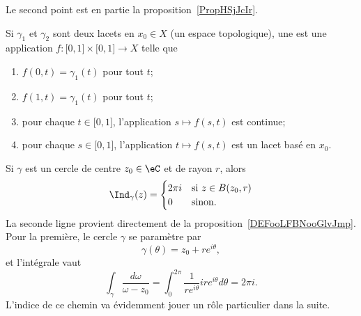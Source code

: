Le second point est en partie la proposition~\ref{PropHSjJcIr}.

\begin{definition}  \label{DefECnFJQp}
	Si \( \gamma_1\) et \( \gamma_2\) sont deux lacets en \( x_0\in X\) (un espace topologique), une  est une application \( f\colon \mathopen[ 0 , 1 \mathclose]\times \mathopen[ 0 , 1 \mathclose]\to X\) telle que
	\begin{enumerate}
		\item
		      \( f(0,t)=\gamma_1(t)\) pour tout \( t\);
		\item
		      \( f(1,t)=\gamma_1(t)\) pour tout \( t\);
		\item
		      pour chaque \( t\in \mathopen[ 0 , 1 \mathclose]\), l'application \( s\mapsto f(s,t)\) est continue;
		\item
		      pour chaque \( s\in \mathopen[ 0 , 1 \mathclose]\), l'application \( t\mapsto f(s,t)\) est un lacet basé en \( x_0\).
	\end{enumerate}
\end{definition}

\begin{example} \label{ExradygL}
	Si \( \gamma\) est un cercle de centre \( z_0\in \eC\) et de rayon \( r\), alors
	\begin{equation}
		\Ind_{\gamma}(z)=\begin{cases}
			2\pi i & \text{si } z\in B(z_0,r) \\
			0      & \text{sinon}.
		\end{cases}
	\end{equation}
	La seconde ligne provient directement de la proposition~\ref{DEFooLFBNooGlvJmp}. Pour la première, le cercle \( \gamma\) se paramètre par
	\begin{equation}
		\gamma(\theta)=z_0+r e^{i\theta},
	\end{equation}
	et l'intégrale vaut
	\begin{equation}
		\int_{\gamma}\frac{ d\omega }{ \omega-z_0 }=\int_0^{2\pi}\frac{1}{ r e^{i\theta} }ir e^{i\theta}d\theta=2\pi i.
	\end{equation}
	L'indice de ce chemin va évidemment jouer un rôle particulier dans la suite.
\end{example}

